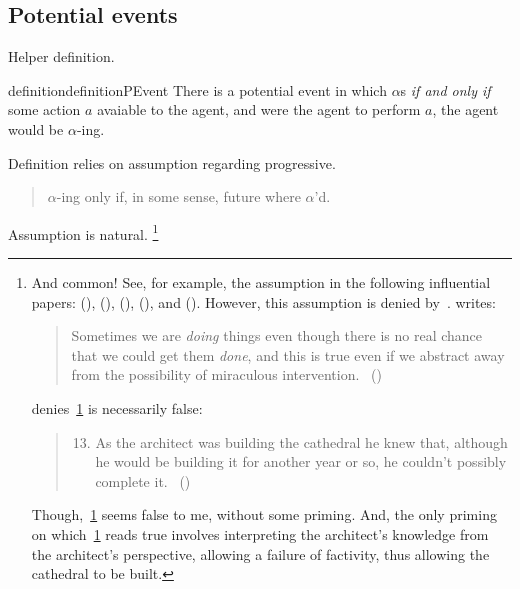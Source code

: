 \subsection{Potential events}
\label{sec:potential-events}

\begin{note}
  Helper definition.

  \begin{restatable}{definition}{definitionPEvent}
    There is a potential event in which \vAgent{} \(\alpha\)s
    \emph{if and only if}
    some action \(a\) avaiable to the agent, and were the agent to perform \(a\), the agent would be \(\alpha\)-ing.
  \end{restatable}
\end{note}

\begin{note}
  Definition relies on assumption regarding progressive.
  \begin{quote}
    \(\alpha\)-ing only if, in some sense, future where \(\alpha\)'d.
  \end{quote}

  Assumption is natural.%
  \footnote{
    And common!
    See, for example, the assumption in the following influential papers:
    (\cite{Bennett:1972uw}),
    (\cite{Dowty:1979vq}),
    (\cite{Parsons:1990aa}),
    (\cite{Landman:1992wh}), and
    (\cite{Portner:1998um}).
    However, this assumption is denied by~\textcite{Szabo:2004ul}.
    \citeauthor{Szabo:2004ul} writes:
    \begin{quote}
      Sometimes we are \emph{doing} things even though there is no real chance that we could get them \emph{done}, and this is true even if we abstract away from the possibility of miraculous intervention.%
      \mbox{ }\hfill\mbox{(\citeyear[40]{Szabo:2004ul})}
    \end{quote}
    \citeauthor{Szabo:2004ul} denies~\ref{Szabo:Arch} is necessarily false:
    \begin{quote}
      \begin{enumerate}[label=(\arabic*), ref=(\arabic*)]
        \setcounter{enumi}{12}
      \item
        \label{Szabo:Arch}
        As the architect was building the cathedral he knew that, although he would be building it for another year or so, he couldn’t possibly complete it.%
        \mbox{ }\hfill\mbox{(\citeyear[38]{Szabo:2004ul})}
      \end{enumerate}
    \end{quote}
    Though,~\ref{Szabo:Arch} seems false to me, without some priming.
    And, the only priming on which~\ref{Szabo:Arch} reads true involves interpreting the architect's knowledge from the architect's perspective, allowing a failure of factivity, thus allowing the cathedral to be built.

}
\end{note}
